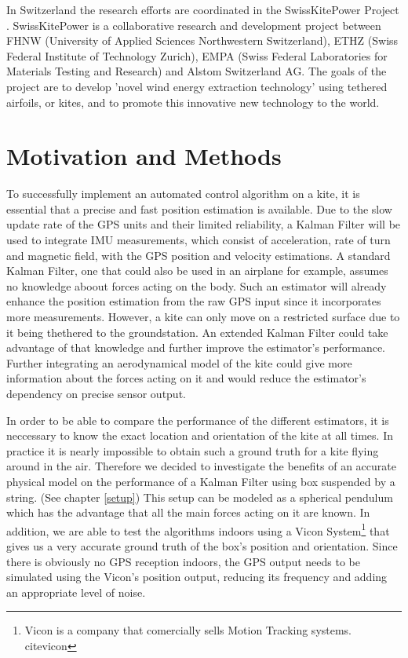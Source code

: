 In Switzerland the research efforts are coordinated in the SwissKitePower Project \cite{skp}. SwissKitePower is a collaborative research and development project between FHNW (University of Applied Sciences Northwestern Switzerland), ETHZ (Swiss Federal Institute of Technology Zurich), EMPA (Swiss Federal Laboratories for Materials Testing and Research) and Alstom Switzerland AG. The goals of the project are to develop 'novel wind energy extraction technology' using tethered airfoils, or kites, and to promote this innovative new technology to the world.



\section{Motivation and Methods}
To successfully implement an automated control algorithm on a kite, it is essential that a precise and fast position estimation is available. Due to the slow update rate of the GPS units and their limited reliability, a Kalman Filter will be used to integrate IMU measurements, which consist of acceleration, rate of turn and magnetic field, with the GPS position and velocity estimations. A standard Kalman Filter, one that could also be used in an airplane for example, assumes no knowledge aboout forces acting on the body. Such an estimator will already enhance the position estimation from the raw GPS input since it incorporates more measurements.  However, a kite can only move on a restricted surface due to it being thethered to the groundstation. An extended Kalman Filter could take advantage of that knowledge and further improve the estimator's performance. Further integrating an aerodynamical model of the kite could give more information about the forces acting on it and would reduce the estimator's dependency on precise sensor output.  

In order to be able to compare the performance of the different estimators, it is neccessary to know the exact location and orientation of the kite at all times. In practice it is nearly impossible to obtain such a ground truth for a kite flying around in the air. Therefore we decided to investigate the benefits of an accurate physical model on the performance of a Kalman Filter using box suspended by a string. (See chapter \ref{setup}) This setup can be modeled as a spherical pendulum which has the advantage that all the main forces acting on it are known.  In addition, we are able to test the algorithms indoors using a Vicon System\footnote{Vicon is a company that comercially sells Motion Tracking systems. cite{vicon}} that gives us a very accurate ground truth of the box's position and orientation. Since there is obviously no GPS reception indoors, the GPS output needs to be simulated using the Vicon's position output, reducing its frequency and adding an appropriate level of noise.



